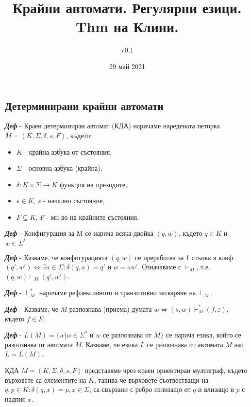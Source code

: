 \documentclass[fleqn,12pt]{article}
\title{Крайни автомати. Регулярни езици. Thm на Клини.}
\author{v0.1}
\date{29 май 2021}
\begin{document}
\maketitle

\tableofcontents
\pagebreak
\begin{flushleft}

\section{Детерминирани крайни автомати}

\textit{\textbf{Деф}} - Краен детерминиран автомат (КДА) наричаме наредената петорка $M = (K, \Sigma, \delta, s, F)$, където:
\begin{itemize}
    \item $K$ - крайна азбука от състояния,
    \item $\Sigma$ - основна азбука (крайна),
    \item $\delta : K \times \Sigma \rightarrow K$ функция на преходите,
    \item $s \in K$, $s$ - начално състояние,
    \item $F \subseteq K$, $F$ - мн-во на крайните състояния.
\end{itemize}

\textit{\textbf{Деф}} - Конфигурация за M се нарича всяка двойка $(q, w)$, където $q \in K$ и $w \in \Sigma^*$

\textit{\textbf{Деф}} - Казваме, че конфигурацията $(q, w)$ се преработва за 1 стъпка в конф. $(q', w') \iff \exists a \in \Sigma : \delta(q, a) = q'$ и $w = aw'$. Означаваме с $\vdash_M$, т.е. $(q, w) \vdash_M (q', w')$.

\textit{\textbf{Деф}} - $\vdash_M^*$ наричаме рефлексивното и транзитивно затваряне на $\vdash_M$.

\textit{\textbf{Деф}} - Казваме, че $M$ разпознава (приема) думата $w \iff (s, w) \vdash_M^* (f, \varepsilon)$, където $f \in F$.

\textit{\textbf{Деф}} - $L(M) = \{w | w \in \Sigma^*$ и $w$ се разпознава от $M\}$ се нарича езика, който се разпознава от автомата $M$. Казваме, че езика $L$ се разпознава от автомата $M$ ако $L = L(M)$.

КДА $M = (K, \Sigma, \delta, s, F)$ представяме чрез краен ориентиран мултиграф, където върховете са елементите на $K$, такива че върховете съотвестващи на $q, p \in K: \delta(q, x) = p, x \in \Sigma$, са свързани с ребро излизащо от $q$ и влизащо в $p$ с надпис $x$.


\end{flushleft}
\end{document}
